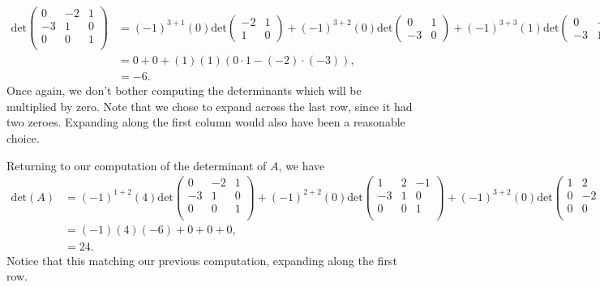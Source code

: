 \documentclass{ximera}
\begin{document}
\begin{example}
\begin{align*}
\textrm{det}\left(\begin{array}{ccc}0&-2&1\\-3&1&0\\0&0&1\\\end{array}\right) &= (-1)^{3+1}(0)\textrm{det}\left(\begin{array}{cc}-2&1\\1&0\end{array}\right) + (-1)^{3+2}(0)\textrm{det}\left(\begin{array}{cc}0&1\\-3&0\end{array}\right) + (-1)^{3+3}(1)\textrm{det}\left(\begin{array}{cc}0&-2\\-3&1\end{array}\right),\\
&= 0 + 0 + (1)(1)(0\cdot 1- (-2)\cdot (-3)),\\
&= -6.
\end{align*}
Once again, we don't bother computing the determinants which will be multiplied by zero. Note that we chose to expand across the last row, since it had two zeroes. Expanding along the first column would also have been a reasonable choice.

Returning to our computation of the determinant of $A$, we have
\begin{align*}
\textrm{det}(A) &= (-1)^{1+2}(4)\textrm{det}\left(\begin{array}{ccc}0&-2&1\\-3&1&0\\0&0&1\\\end{array}\right) + (-1)^{2+2}(0)\textrm{det}\left(\begin{array}{ccc}1&2&-1\\-3&1&0\\0&0&1\\\end{array}\right)+(-1)^{3+2}(0)\textrm{det}\left(\begin{array}{ccc}1&2&-1\\0&-2&1\\0&0&1\\\end{array}\right)+(-1)^{4+2}(0)\textrm{det}\left(\begin{array}{ccc}1&2&-1\\0&-2&1\\-3&1&0\\\end{array}\right),\\
&= (-1)(4)(-6) + 0 + 0 + 0,\\
&= 24.
\end{align*}
Notice that this matching our previous computation, expanding along the first row.
\end{example}
\end{document}
